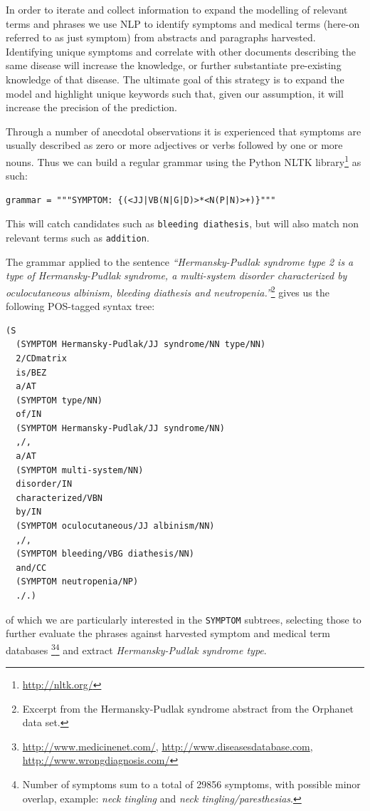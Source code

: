 \documentclass[10pt,letterpaper,final]{article}
\begin{document}
In order to iterate and collect information to expand the modelling of
relevant terms and phrases we use NLP to identify symptoms and medical
terms (here-on referred to as just symptom) from abstracts and
paragraphs harvested. Identifying unique symptoms and correlate with
other documents describing the same disease will increase the knowledge,
or further substantiate pre-existing knowledge of that disease. The
ultimate goal of this strategy is to expand the model and highlight
unique keywords such that, given our assumption, it will increase the
precision of the prediction.

Through a number of anecdotal observations it is experienced that
symptoms are usually described as zero or more adjectives or verbs
followed by one or more nouns. Thus we can build a regular grammar using the Python NLTK
library\footnote{\url{http://nltk.org/}} as such:
\begin{lstlisting}
grammar = """SYMPTOM: {(<JJ|VB(N|G|D)>*<N(P|N)>+)}"""
\end{lstlisting}
This will catch candidates such as \texttt{bleeding diathesis}, but will
also match non relevant terms such as \texttt{addition}.


The grammar applied to the sentence \textit{``Hermansky-Pudlak syndrome
type 2 is a type of Hermansky-Pudlak syndrome, a multi-system disorder
characterized by oculocutaneous albinism, bleeding diathesis and
neutropenia.''}\footnote{Excerpt from the
Hermansky-Pudlak syndrome abstract from the Orphanet data set.} gives us
the following POS-tagged syntax tree:
\begin{lstlisting}
(S
  (SYMPTOM Hermansky-Pudlak/JJ syndrome/NN type/NN)
  2/CDmatrix
  is/BEZ
  a/AT
  (SYMPTOM type/NN)
  of/IN
  (SYMPTOM Hermansky-Pudlak/JJ syndrome/NN)
  ,/,
  a/AT
  (SYMPTOM multi-system/NN)
  disorder/IN
  characterized/VBN
  by/IN
  (SYMPTOM oculocutaneous/JJ albinism/NN)
  ,/,
  (SYMPTOM bleeding/VBG diathesis/NN)
  and/CC
  (SYMPTOM neutropenia/NP)
  ./.)
\end{lstlisting}
of which we are particularly interested in the \texttt{SYMPTOM}
subtrees, selecting those to further evaluate the phrases against
harvested symptom and medical term databases
\footnote{\url{http://www.medicinenet.com/},
\url{http://www.diseasesdatabase.com},
\url{http://www.wrongdiagnosis.com/}}\footnote{Number of symptoms sum to
a total of 29856 symptoms, with possible minor overlap, example:
\textit{neck tingling} and \textit{neck tingling/paresthesias}.} and
extract \textit{Hermansky-Pudlak syndrome type}.
\end{document}

